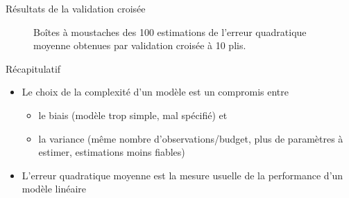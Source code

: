 \documentclass[
  ignorenonframetext,
]{beamer}
\providecommand{\tightlist}{%
  \setlength{\itemsep}{0pt}\setlength{\parskip}{0pt}}\usepackage{longtable,booktabs,array}
\begin{document}
\begin{frame}{Résultats de la validation croisée}
\label{ruxe9sultats-de-la-validation-croisuxe9e}
\begin{figure}


\caption{\label{fig-plotcv}Boîtes à moustaches des 100 estimations de
l'erreur quadratique moyenne obtenues par validation croisée à 10 plis.}

\end{figure}%
\end{frame}

\begin{frame}{Récapitulatif}
\label{ruxe9capitulatif}
\begin{itemize}
\tightlist
\item
  Le choix de la complexité d'un modèle est un compromis entre

  \begin{itemize}
  \tightlist
  \item
    le biais (modèle trop simple, mal spécifié) et
  \item
    la variance (même nombre d'observations/budget, plus de paramètres à
    estimer, estimations moins fiables)
  \end{itemize}
\item
  L'erreur quadratique moyenne est la mesure usuelle de la performance
  d'un modèle linéaire
\end{itemize}
\end{frame}
\end{document}
